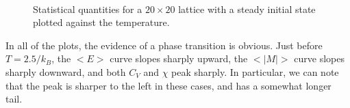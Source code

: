 \documentclass[12pt]{article}
\numberwithin{equation}{section}
\begin{document}
\begin{figure}[h]
\begin{center}
 \\
\caption{Statistical quantities for a $20\times20$ lattice with a steady initial state plotted against the temperature.}
\label{fig:latsize20}
\end{center}
\end{figure}

\par In all of the plots, the evidence of a phase transition is obvious.  Just before $T=2.5/k_{B}$, the $<E>$ curve slopes sharply upward, the $<|M|>$ curve slopes sharply downward, and both $C_{V}$ and $\chi$ peak sharply.  In particular, we can note that the peak is sharper to the left in these cases, and has a somewhat longer tail.
\end{document}

